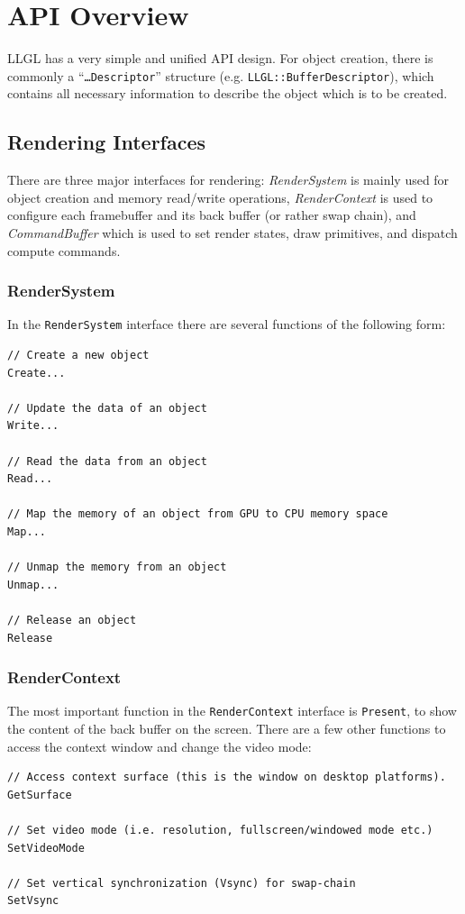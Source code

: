 \documentclass{article}
\begin{document}

\clearpage
\newpage
\section{API Overview}

LLGL has a very simple and unified API design.
For object creation, there is commonly a ``\texttt{\dots Descriptor}'' structure (e.g. \texttt{LLGL::BufferDescriptor}),
which contains all necessary information to describe the object which is to be created.

\subsection{Rendering Interfaces}

There are three major interfaces for rendering:
\emph{RenderSystem} is mainly used for object creation and memory read/write operations,
\emph{RenderContext} is used to configure each framebuffer and its back buffer (or rather swap chain),
and \emph{CommandBuffer} which is used to set render states, draw primitives, and dispatch compute commands.

\subsubsection{RenderSystem}

In the \texttt{RenderSystem} interface there are several functions of the following form:
\begin{lstlisting}
// Create a new object
Create...

// Update the data of an object
Write...

// Read the data from an object
Read...

// Map the memory of an object from GPU to CPU memory space
Map...

// Unmap the memory from an object
Unmap...

// Release an object
Release
\end{lstlisting}

\subsubsection{RenderContext}

The most important function in the \texttt{RenderContext} interface is \texttt{Present},
to show the content of the back buffer on the screen.
There are a few other functions to access the context window and change the video mode:
\begin{lstlisting}
// Access context surface (this is the window on desktop platforms).
GetSurface

// Set video mode (i.e. resolution, fullscreen/windowed mode etc.)
SetVideoMode

// Set vertical synchronization (Vsync) for swap-chain
SetVsync
\end{lstlisting}
\end{document}
